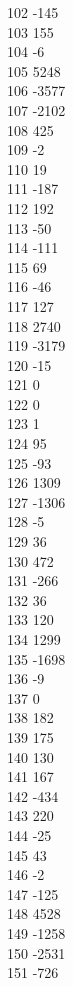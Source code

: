{ 102	-145 \\
 103	155 \\
 104	-6 \\
 105	5248 \\
 106	-3577 \\
 107	-2102 \\
 108	425 \\
 109	-2 \\
 110	19 \\
 111	-187 \\
 112	192 \\
 113	-50 \\
 114	-111 \\
 115	69 \\
 116	-46 \\
 117	127 \\
 118	2740 \\
 119	-3179 \\
 120	-15 \\
 121	0 \\
 122	0 \\
 123	1 \\
 124	95 \\
 125	-93 \\
 126	1309 \\
 127	-1306 \\
 128	-5 \\
 129	36 \\
 130	472 \\
 131	-266 \\
 132	36 \\
 133	120 \\
 134	1299 \\
 135	-1698 \\
 136	-9 \\
 137	0 \\
 138	182 \\
 139	175 \\
 140	130 \\
 141	167 \\
 142	-434 \\
 143	220 \\
 144	-25 \\
 145	43 \\
 146	-2 \\
 147	-125 \\
 148	4528 \\
 149	-1258 \\
 150	-2531 \\
 151	-726 \\
}

